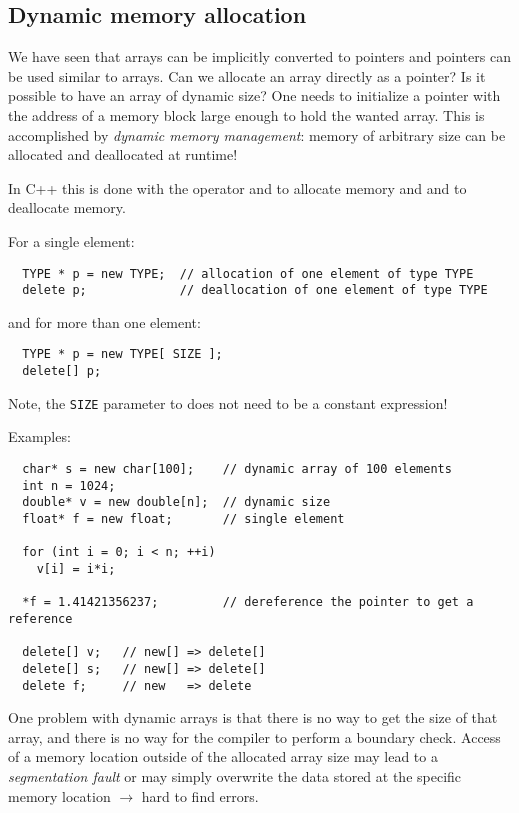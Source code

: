 \subsection{Dynamic memory allocation}
We have seen that arrays can be implicitly converted to pointers and pointers can be used similar to arrays. Can we allocate an array directly as
a pointer? Is it possible to have an array of dynamic size? One needs to initialize a pointer with the address of a memory block large enough to hold
the wanted array. This is accomplished by \emph{dynamic memory management}: memory of arbitrary size can be allocated and deallocated at runtime!

In C++ this is done with the operator  and  to allocate memory and  and  to deallocate memory.

For a single element:
\begin{verbatim}
  TYPE * p = new TYPE;  // allocation of one element of type TYPE
  delete p;             // deallocation of one element of type TYPE
\end{verbatim}
and for more than one element:
\begin{verbatim}
  TYPE * p = new TYPE[ SIZE ];
  delete[] p;
\end{verbatim}

Note, the \texttt{SIZE} parameter to  does not need to be a constant expression!

Examples:
\begin{verbatim}
  char* s = new char[100];    // dynamic array of 100 elements
  int n = 1024;
  double* v = new double[n];  // dynamic size
  float* f = new float;       // single element

  for (int i = 0; i < n; ++i)
    v[i] = i*i;

  *f = 1.41421356237;         // dereference the pointer to get a reference

  delete[] v;   // new[] => delete[]
  delete[] s;   // new[] => delete[]
  delete f;     // new   => delete
\end{verbatim}

One problem with dynamic arrays is that there is no way to get the size of that array, and there is no way for the compiler
to perform a boundary check. Access of a memory location outside of the allocated array size may lead to a \emph{segmentation fault} or
may simply overwrite the data stored at the specific memory location $\rightarrow$ hard to find errors.

